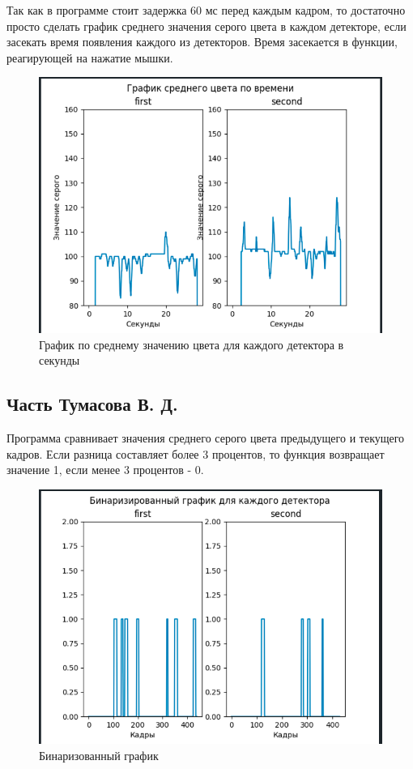 \documentclass[a4paper,12pt]{article}
\begin{document}
Так как в программе стоит задержка 60 мс перед каждым кадром, то достаточно просто сделать график среднего значения серого цвета в каждом детекторе, если засекать время появления каждого из детекторов.
Время засекается в функции, реагирующей на нажатие мышки.

\begin{figure}[h!]
  \begin{center}
      \includegraphics[width=0.8\linewidth]{time_grayscale}
      \caption{График по среднему значению цвета для каждого детектора в секунды} 
      \label{} 
  \end{center} 
\end{figure}

\newpage

\subsection{Часть Тумасова В. Д.}

Программа сравнивает значения среднего серого цвета предыдущего и текущего кадров. Если разница составляет более 3 процентов, то функция возвращает значение 1, если менее 3 процентов - 0. 

\begin{figure}[h!]
  \begin{center}
      \includegraphics[width=0.8\linewidth]{bin_graph}
      \caption{Бинаризованный график} 
      \label{} 
  \end{center} 
\end{figure}
\end{document}
